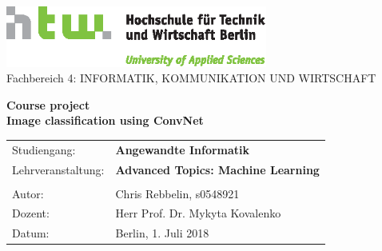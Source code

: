 \begin{titlepage}
\hypersetup{pageanchor=false}

\begin{center}
    \includegraphics[height=2cm,keepaspectratio]{logo/HTW_Logo_quer_4c.eps}\\
    {\large Fachbereich 4: INFORMATIK, KOMMUNIKATION UND WIRTSCHAFT}\\
{\large



    {\huge\bf Course project }\\
    {\huge\bf\setlength{\baselineskip}{3.2ex} \color{htwgreen}Image classification using ConvNet\\}
    {\Large\renewcommand{\arraystretch}{1.3}
    \begin{tabular}[t]{ll}
	Studiengang:			& \textbf{Angewandte Informatik}\\
	Lehrveranstaltung:		& \textbf{Advanced Topics: Machine Learning}\\
\\
	Autor:				& Chris Rebbelin, s0548921\\
							
	Dozent:					& Herr Prof. Dr. Mykyta Kovalenko\\
	Datum:					& Berlin, 1. Juli 2018\\
    \end{tabular}}
}\end{center}
\end{titlepage}
